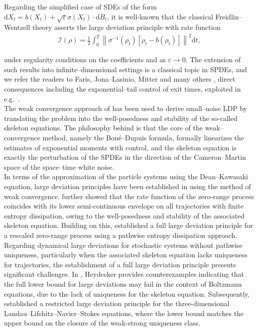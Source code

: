 Regarding the simplified case of SDEs of the form $\mathrm{d}X_t = b(X_t) + \sqrt{\varepsilon}\sigma(X_t)\cdot \mathrm{d}B_t$, it is well-known that the classical Freidlin--Wentzell theory \cite{Freidlin1998} asserts the large deviation principle with rate function
\begin{align*}
\mathcal{I}(\rho) = \frac{1}{2} \int_0^T \left\| \sigma^{-1}(\rho_t) \left[ \dot{\rho}_t - b(\rho_t) \right] \right\|^2 \mathrm{d}t,
\end{align*}

under regularity conditions on the coefficients and as $\varepsilon \to 0$. The extension of such results into infinite--dimensional settings is a classical topic in SPDEs, and we refer the readers to Faris, Jona--Lasinio, Mitter and many others \cite{FJ82,JM90,QY98,M10,CM11,HW15}, direct consequences including the exponential--tail control of exit times, exploited in e.g.\ \cite{Tsatsoulis2020}.\\

The weak convergence approach of \cite{DE11,BDM11} has been used to derive small--noise LDP by translating the problem into the well-posedness and stability of the so-called skeleton equations. The philosophy behind is that the core of the weak--convergence method, namely the Boué--Dupuis formula, formally linearizes the estimates of exponential moments with control, and the skeleton equation is exactly the perturbation of the SPDEs in the direction of the Cameron--Martin space of the space--time white noise. \\

In terms of the approximation of the particle systems using the Dean--Kawasaki equation, large deviation principles have been established in \cite{FG23,WZ22} using the method of weak convergence. \cite{FG23} further showed that the rate function of the zero-range process coincides with its lower semi-continuous envelope on all trajectories with finite entropy dissipation, owing to the well-posedness and stability of the associated skeleton equation. Building on this, \cite{GessHeydecker2023} established a full large deviation principle for a rescaled zero-range process using a pathwise entropy dissipation approach. \\

Regarding dynamical large deviations for stochastic systems without pathwise uniqueness, particularly when the associated skeleton equation lacks uniqueness for trajectories, the establishment of a full large deviation principle presents significant challenges. In \cite{Heydecker2023}, Heydecker provides counterexamples indicating that the full lower bound for large deviations may fail in the context of Boltzmann equations, due to the lack of uniqueness for the skeleton equation. Subsequently, \cite{GessHeydeckerWu2023} established a restricted large deviation principle for the three-dimensional Landau--Lifshitz--Navier--Stokes equations, where the lower bound matches the upper bound on the closure of the weak-strong uniqueness class.

